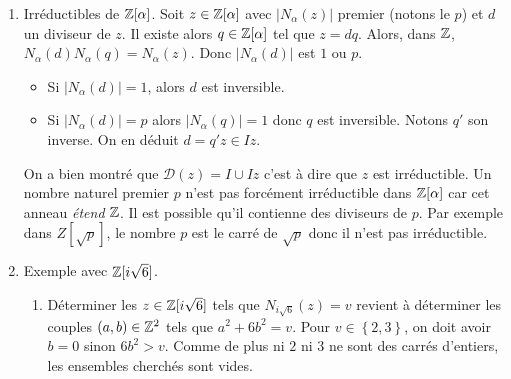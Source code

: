 \begin{enumerate}
  \item Irréductibles de $\mathbb{Z}[\alpha]$.\newline
  Soit $z\in \mathbb{Z}[\alpha]$ avec $|N_{\alpha}(z)|$ premier (notons le $p$) et $d$ un diviseur de $z$.\newline
  Il existe alors $q\in\mathbb{Z}[\alpha]$ tel que $z=dq$. Alors, dans $\mathbb{Z}$, $N_{\alpha}(d)N_{\alpha}(q)=N_{\alpha}(z)$. Donc $|N_{\alpha}(d)|$ est $1$ ou $p$.
  \begin{itemize}
    \item Si $|N_{\alpha}(d)|=1$, alors $d$ est inversible.
    \item Si $|N_{\alpha}(d)|=p$ alors $|N_{\alpha}(q)|=1$ donc $q$ est inversible. Notons $q'$ son inverse. On en déduit $d=q'z\in Iz$.
  \end{itemize}
  On a bien montré que $\mathcal{D}(z) = I \cup Iz$ c'est à dire que $z$ est irréductible.\newline
  Un nombre naturel premier $p$ n'est pas forcément irréductible dans $\mathbb{Z}[\alpha]$ car cet anneau \emph{étend} $\mathbb{Z}$. Il est possible qu'il contienne des diviseurs de $p$. Par exemple dans $Z[\sqrt{p}]$, le nombre $p$ est le carré de $\sqrt{p}$ donc il n'est pas irréductible.
  
  \item Exemple avec $\mathbb{Z}[i\sqrt{6}]$.
  \begin{enumerate}
    \item Déterminer les $z\in\mathbb{Z}[i\sqrt{6}]$ tels que $N_{i\sqrt{6}}(z) = v$ revient à déterminer les couples $(a,b)\in \mathbb{Z}^2$ tels que $a^2 + 6b^2=v$.\newline
    Pour $v\in\left\lbrace 2, 3\right\rbrace$, on doit avoir $b=0$ sinon $6b^2>v$. Comme de plus ni $2$ ni $3$ ne sont des carrés d'entiers, les ensembles cherchés sont vides.


\end{enumerate}
\end{enumerate}

